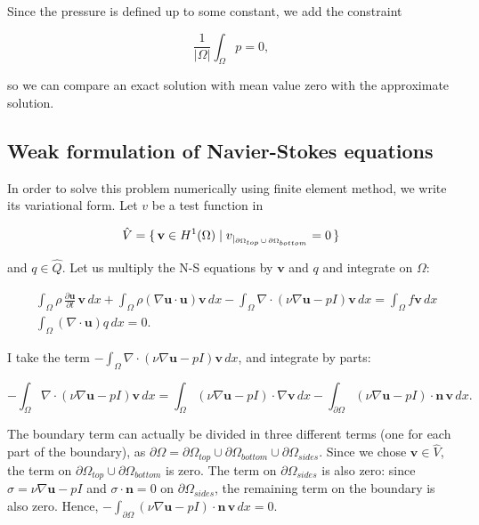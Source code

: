 \documentclass[11pt,a4paper,titlepage]{report}
\begin{document}
Since the pressure is defined up to some constant, we add the constraint 

\[
\frac{1}{|\Omega |} \int_{\Omega} p = 0,
\]

so we can compare an exact solution with mean value zero with the approximate solution. 

\subsection{Weak formulation of Navier-Stokes equations}


In order to solve this problem numerically using finite element method, we write its variational form. Let $v$ be a test function in

\[
\hat{V} = \set{\mathbf{v} \in H^1(\Omega) | v_{|_{\partial \Omega_{top} \, \cup \, \partial \Omega_{bottom}}} = 0}
\]

and $q \in \hat{Q}$. Let us multiply the N-S equations by $\mathbf{v}$ and $q$ and integrate on $\Omega$:

\begin{align}
&\int_{\Omega} \rho \, \frac{\partial \mathbf{u}} {\partial t} \, \mathbf{v} \, dx + \int_{\Omega} \rho (\nabla \mathbf{u} \cdot \mathbf{u} )\mathbf{v} \, dx - \int_{\Omega} \nabla \cdot (\nu \nabla \mathbf{u} - pI)\mathbf{v} \, dx = \int_{\Omega} f\mathbf{v} \, dx \\
&\int_{\Omega} (\nabla \cdot \mathbf{u}) q \, dx = 0.
\end{align}

I take the term $- \int_{\Omega} \nabla \cdot (\nu \nabla \mathbf{u} - pI)\mathbf{v} \, dx$, and integrate by parts:

\[
- \int_{\Omega} \nabla \cdot (\nu \nabla \mathbf{u} - pI)\mathbf{v} \, dx = \int_{\Omega} (\nu \nabla \mathbf{u} - pI) \cdot \nabla \mathbf{v} \, dx - \int_{\partial \Omega} (\nu \nabla \mathbf{u} - pI) \cdot \mathbf{n} \, \mathbf{v} \, dx.
\]

The boundary term can actually be divided in three different terms (one for each part of the boundary), as $\partial \Omega = \partial \Omega_{top} \cup \partial \Omega_{bottom} \cup \partial \Omega_{sides}$. Since we chose $\mathbf{v} \in \hat{V}$, the term on $\partial \Omega_{top} \cup \partial \Omega_{bottom}$ is zero. The term on $\partial \Omega_{sides}$ is also zero: since $\sigma = \nu \nabla \mathbf{u} - pI$ and $\sigma \cdot \mathbf{n} = 0$ on $\partial \Omega_{sides}$, the remaining term on the boundary is also zero. Hence, $- \int_{\partial \Omega} (\nu \nabla \mathbf{u} - pI) \cdot \mathbf{n} \, \mathbf{v} \, dx = 0$.
\end{document}
